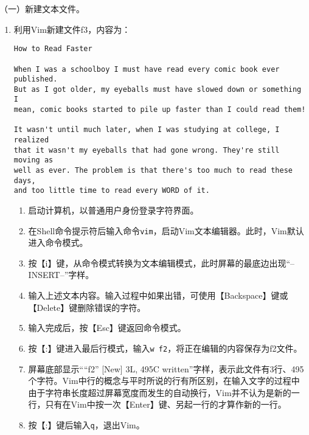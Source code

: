 \vspace{0.1in}
（一）新建文本文件。
\begin{enumerate}
  \item 利用Vim新建文件f3，内容为：
\begin{verbatim}
How to Read Faster

When I was a schoolboy I must have read every comic book ever published.
But as I got older, my eyeballs must have slowed down or something I
mean, comic books started to pile up faster than I could read them!

It wasn't until much later, when I was studying at college, I realized
that it wasn't my eyeballs that had gone wrong. They're still moving as
well as ever. The problem is that there's too much to read these days,
and too little time to read every WORD of it.
\end{verbatim}
    \begin{enumerate}
      \item 启动计算机，以普通用户身份登录字符界面。
      \item 在Shell命令提示符后输入命令\verb|vim|，启动Vim文本编辑器。此时，Vim默认进入命令模式。
      \item 按【i】键，从命令模式转换为文本编辑模式，此时屏幕的最底边出现“--INSERT--”字样。
      \item 输入上述文本内容。输入过程中如果出错，可使用【Backspace】键或【Delete】键删除错误的字符。
      \item 输入完成后，按【Esc】键返回命令模式。
      \item 按【:】键进入最后行模式，输入\verb|w f2|，将正在编辑的内容保存为f2文件。
      \item 屏幕底部显示“``f2'' [New] 3L, 495C written”字样，表示此文件有3行、495个字符。Vim中行的概念与平时所说的行有所区别，在输入文字的过程中由于字符串长度超过屏幕宽度而发生的自动换行，Vim并不认为是新的一行，只有在Vim中按一次【Enter】键、另起一行的才算作新的一行。
      \item 按【:】键后输入\verb|q|，退出Vim。
    \end{enumerate}
\end{enumerate}

